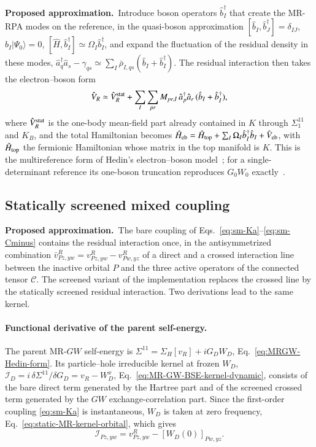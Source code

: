 \documentclass[aip,jcp,reprint,noshowkeys,superscriptaddress]{revtex4-1}
\newcommand{\Proposed}{\textbf{Proposed approximation.}\ }
\begin{document}
\Proposed Introduce boson operators $\hat b_I^\dagger$ that create the
MR-RPA modes on the reference, in the quasi-boson approximation
$[\hat b_I,\hat b_J^\dagger]=\delta_{IJ}$, $\hat b_I|\Psi_0\rangle=0$,
$[\hat H,\hat b_I^\dagger]\simeq\Omega_I\hat b_I^\dagger$, and expand the
fluctuation of the residual density in these modes,
$\hat a_q^\dagger\hat a_s-\gamma_{qs}\simeq\sum_I\bar\rho_{I,qs}(\hat b_I+\hat b_I^\dagger)$.
The residual interaction then takes the electron--boson form
\begin{equation}
  \hat V_R\simeq\hat V_R^{\rm stat}
  +\sum_I\sum_{pr}M_{pr,I}\,\hat a_p^\dagger\hat a_r\,(\hat b_I+\hat b_I^\dagger),
  \label{eq:sm-Veb}
\end{equation}
where $\hat V_R^{\rm stat}$ is the one-body mean-field part already
contained in $K$ through $\Sigma^{11}_1$ and $K_B$, and the total
Hamiltonian becomes
$\hat H_{\rm eb}=\hat H_{\rm top}+\sum_I\Omega_I\hat b_I^\dagger\hat b_I+\hat V_{\rm eb}$,
with $\hat H_{\rm top}$ the fermionic Hamiltonian whose matrix in the top
manifold is $K$.  This is the multireference form of Hedin's
electron--boson model~\cite{Hedin1999}; for a single-determinant reference
its one-boson truncation reproduces $G_0W_0$
exactly~\cite{BintrimBerkelbach2021,TolleChan2023}.

\subsection{Statically screened mixed coupling}
\label{sec:sm-screened}

\Proposed The bare coupling of Eqs.~\eqref{eq:sm-Ka}--\eqref{eq:sm-Cminus}
contains the residual interaction once, in the antisymmetrized combination
$\bar v^R_{Pz,yw}=v^R_{Pz,yw}-v^R_{Pw,yz}$ of a direct and a crossed
interaction line between the inactive orbital $P$ and the three active
operators of the connected tensor $\mathcal C$.  The screened variant of the
implementation replaces the crossed line by the statically screened residual
interaction.  Two derivations lead to the same kernel.

\paragraph{Functional derivative of the parent self-energy.}
The parent MR-$GW$ self-energy is $\Sigma^{11}=\Sigma_H[v_R]+iG_DW_D$,
Eq.~\eqref{eq:MRGW-Hedin-form}.  Its particle--hole irreducible kernel at
frozen $W_D$, $\mathcal I_D=i\,\delta\Sigma^{11}/\delta G_D=v_R-W_D^{x}$,
Eq.~\eqref{eq:MR-GW-BSE-kernel-dynamic}, consists of the bare direct term
generated by the Hartree part and of the screened crossed term generated by
the $GW$ exchange-correlation part.  Since the first-order coupling
\eqref{eq:sm-Ka} is instantaneous, $W_D$ is taken at zero frequency,
Eq.~\eqref{eq:static-MR-kernel-orbital}, which gives
\begin{equation}
  \mathcal I_{Pz,yw}=v^R_{Pz,yw}-[W_D(0)]_{Pw,yz}.
  \label{eq:sm-kernel-scr}
\end{equation}
\end{document}
